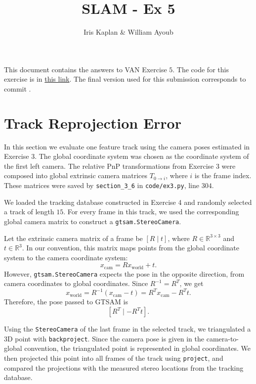\documentclass[12pt]{article}
\begin{document}
\title{SLAM - Ex 5}
\author{Iris Kaplan \& William Ayoub}
\maketitle

This document contains the answers to VAN Exercise $5$. The code for this exercise is in \href{https://github.com/iriskaplan/SLAM_Project}{this link}. The final version used for this submission corresponds to commit
\href{todo: add!!11}
{\texttt{}}.



\section{Track Reprojection Error}

In this section we evaluate one feature track using the camera poses estimated in Exercise 3. The global coordinate system was chosen as the coordinate system of the first left camera. The relative PnP transformations from Exercise 3 were composed into global extrinsic camera matrices $T_{0 \to i}$, where $i$ is the frame index. These matrices were saved by \texttt{section\_3\_6} in \texttt{code/ex3.py}, line $304$.

We loaded the tracking database constructed in Exercise 4 and randomly selected a track of length $15$. For every frame in this track, we used the corresponding global camera matrix to construct a \texttt{gtsam.StereoCamera}.

Let the extrinsic camera matrix of a frame be $[R \mid t]$, where $R \in \mathbb{R}^{3 \times 3}$ and $t \in \mathbb{R}^{3}$. In our convention, this matrix maps points from the global coordinate system to the camera coordinate system:
$$
x_{\text{cam}} = R x_{\text{world}} + t.
$$
However, \texttt{gtsam.StereoCamera} expects the pose in the opposite direction, from camera coordinates to global coordinates. Since $R^{-1}=R^T$, we get
$$
x_{\text{world}}
=
R^{-1}(x_{\text{cam}} - t)
=
R^T x_{\text{cam}} - R^T t.
$$
Therefore, the pose passed to GTSAM is
$$
\left[
R^T \mid -R^T t
\right].
$$

Using the \texttt{StereoCamera} of the last frame in the selected track, we triangulated a 3D point with \texttt{backproject}. Since the camera pose is given in the camera-to-global convention, the triangulated point is represented in global coordinates. We then projected this point into all frames of the track using \texttt{project}, and compared the projections with the measured stereo locations from the tracking database.
\end{document}
